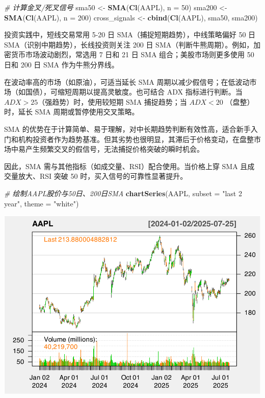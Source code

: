 \documentclass[]{ctexbook}
\newenvironment{Shaded}{\begin{snugshade}}{\end{snugshade}}
\newcommand{\AttributeTok}[1]{\textcolor[rgb]{0.13,0.29,0.53}{#1}}
\newcommand{\CommentTok}[1]{\textcolor[rgb]{0.56,0.35,0.01}{\textit{#1}}}
\newcommand{\DecValTok}[1]{\textcolor[rgb]{0.00,0.00,0.81}{#1}}
\newcommand{\FunctionTok}[1]{\textcolor[rgb]{0.13,0.29,0.53}{\textbf{#1}}}
\newcommand{\NormalTok}[1]{#1}
\newcommand{\OtherTok}[1]{\textcolor[rgb]{0.56,0.35,0.01}{#1}}
\newcommand{\StringTok}[1]{\textcolor[rgb]{0.31,0.60,0.02}{#1}}
\begin{document}
\begin{Shaded}
\begin{Highlighting}[]
\CommentTok{\# 计算金叉/死叉信号}
\NormalTok{sma50 }\OtherTok{\textless{}{-}} \FunctionTok{SMA}\NormalTok{(}\FunctionTok{Cl}\NormalTok{(AAPL), }\AttributeTok{n =} \DecValTok{50}\NormalTok{)}
\NormalTok{sma200 }\OtherTok{\textless{}{-}} \FunctionTok{SMA}\NormalTok{(}\FunctionTok{Cl}\NormalTok{(AAPL), }\AttributeTok{n =} \DecValTok{200}\NormalTok{)}
\NormalTok{cross\_signals }\OtherTok{\textless{}{-}} \FunctionTok{cbind}\NormalTok{(}\FunctionTok{Cl}\NormalTok{(AAPL), sma50, sma200)}
\end{Highlighting}
\end{Shaded}

投资实践中，短线交易常用 5-20 日 SMA（捕捉短期趋势），中线策略偏好 50 日 SMA（识别中期趋势），长线投资则关注 200 日 SMA（判断牛熊周期）。例如，加密货币市场波动剧烈，常选用 7 日和 21 日 SMA 组合；美股市场则更多使用 50 日和 200 日 SMA 作为牛熊分界线。

在波动率高的市场（如原油），可适当延长 SMA 周期以减少假信号；在低波动市场（如国债），可缩短周期以提高灵敏度。也可结合 ADX 指标进行判断。当 \(ADX > 25\)（强趋势）时，使用较短期 SMA 捕捉趋势；当
\(ADX<20\) （盘整）时，延长 SMA 周期或暂停使用交叉策略。

SMA 的优势在于计算简单、易于理解，对中长期趋势判断有效性高，适合新手入门和机构投资者作为趋势基准。但其劣势也很明显，其滞后于价格变动，在盘整市场中易产生频繁交叉的假信号，无法捕捉价格突破的瞬时机会。

因此，SMA 需与其他指标（如成交量、RSI）配合使用。当价格上穿 SMA 且成交量放大、RSI 突破 50 时，买入信号的可靠性显著提升。

\begin{Shaded}
\begin{Highlighting}[]
\CommentTok{\# 绘制AAPL股价与50日、200日SMA}
\FunctionTok{chartSeries}\NormalTok{(AAPL, }\AttributeTok{subset =} \StringTok{"last 2 year"}\NormalTok{, }\AttributeTok{theme =} \StringTok{"white"}\NormalTok{)}
\end{Highlighting}
\end{Shaded}

\includegraphics[width=0.9\linewidth]{QuantmodHandbook_files/figure-latex/sma_2-1}
\end{document}
